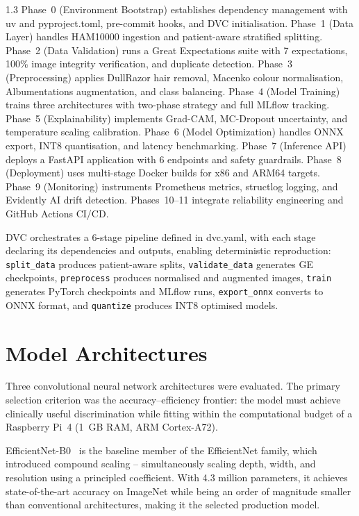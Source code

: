 \begin{spacing}{1.3}
Phase~0 (Environment Bootstrap) establishes dependency management with uv and pyproject.toml, pre-commit hooks, and DVC initialisation. Phase~1 (Data Layer) handles HAM10000 ingestion and patient-aware stratified splitting. Phase~2 (Data Validation) runs a Great Expectations suite with 7 expectations, 100\% image integrity verification, and duplicate detection. Phase~3 (Preprocessing) applies DullRazor hair removal, Macenko colour normalisation, Albumentations augmentation, and class balancing. Phase~4 (Model Training) trains three architectures with two-phase strategy and full MLflow tracking. Phase~5 (Explainability) implements Grad-CAM, MC-Dropout uncertainty, and temperature scaling calibration. Phase~6 (Model Optimization) handles ONNX export, INT8 quantisation, and latency benchmarking. Phase~7 (Inference API) deploys a FastAPI application with 6 endpoints and safety guardrails. Phase~8 (Deployment) uses multi-stage Docker builds for x86 and ARM64 targets. Phase~9 (Monitoring) instruments Prometheus metrics, structlog logging, and Evidently AI drift detection. Phases~10--11 integrate reliability engineering and GitHub Actions CI/CD.

DVC orchestrates a 6-stage pipeline defined in dvc.yaml, with each stage declaring its dependencies and outputs, enabling deterministic reproduction: \texttt{split\_data} produces patient-aware splits, \texttt{validate\_data} generates GE checkpoints, \texttt{preprocess} produces normalised and augmented images, \texttt{train} generates PyTorch checkpoints and MLflow runs, \texttt{export\_onnx} converts to ONNX format, and \texttt{quantize} produces INT8 optimised models.

\section{Model Architectures}

Three convolutional neural network architectures were evaluated. The primary selection criterion was the accuracy--efficiency frontier: the model must achieve clinically useful discrimination while fitting within the computational budget of a Raspberry Pi~4 (1~GB RAM, ARM Cortex-A72).

EfficientNet-B0~\cite{tan2019} is the baseline member of the EfficientNet family, which introduced compound scaling -- simultaneously scaling depth, width, and resolution using a principled coefficient. With 4.3 million parameters, it achieves state-of-the-art accuracy on ImageNet while being an order of magnitude smaller than conventional architectures, making it the selected production model.


\end{spacing}
